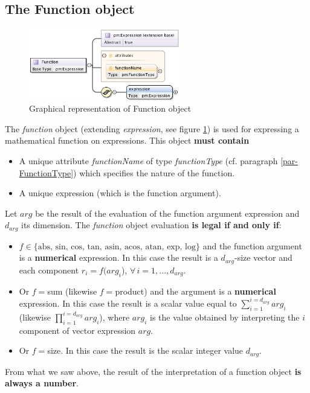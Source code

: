 \documentclass[a4paper,11pt] {ivoa}
\begin{document}
\subsection{The Function object}\label{par02_05}
\begin{figure}[htbp]
\begin{center}
\includegraphics[width=0.6\textwidth]{pictures/Function.jpg} 
\caption{Graphical representation of Function object}
\label{Pic-Function}
\end{center}
\end{figure}
The {\it function} object (extending {\it expression}, see figure \ref{Pic-Function}) is used for
expressing a mathematical function on expressions.
This object {\bf must contain} 
\begin{itemize}
\item A unique attribute {\it functionName} of type {\it functionType} (cf. paragraph
\ref{par-FunctionType}) which specifies the nature of the function.
\item A unique expression (which is the function argument).\\
\end{itemize}
Let $arg$ be the result of the evaluation of the function argument expression and  $d_{arg}$ its
dimension.
The {\it function} object evaluation {\bf is legal if and only if}:
\begin{itemize}
\item $f  \in \{ \mbox{abs, sin, cos, tan, asin, acos, atan, exp, log} \}$ and the function argument
is a {\bf numerical} expression. In this case the  result  is a $d_{arg}$-size vector and each
component  $r_i = f(arg_i$), $\forall \, i=1,...,d_{arg}$.
\item Or $f=$sum (likewise $f=$product) and the argument is a {\bf numerical} expression. In this
case the result is a scalar value equal to $\sum_{i=1}^{i=d_{arg}} arg_i$ (likewise $\prod
_{i=1}^{i=d_{arg}} arg_i$), where $arg_i$ is the value obtained
by interpreting the $i$ component of vector expression $arg$.
\item Or $f=$size. In this case the result is the scalar integer value $d_{arg}$. 
\end{itemize}
From what we saw above, the result of the interpretation of a function object { \bf is always a number}.
\end{document}
